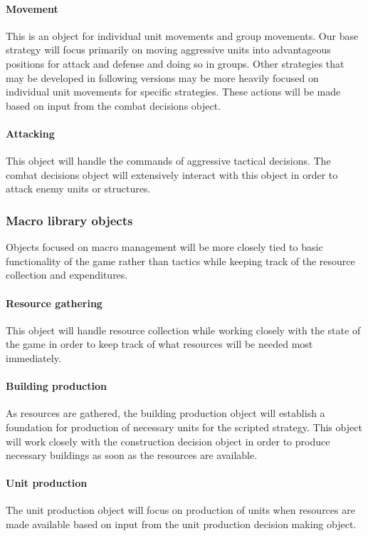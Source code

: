 \documentclass[10pt,letterpaper,onecolumn,draftclsnofoot]{IEEEtran}
\begin{document}
\paragraph{Movement}
This is an object for individual unit movements and group movements. Our base strategy will focus primarily on moving aggressive units into advantageous positions for attack and defense and doing so in groups. Other strategies that may be developed in following versions may be more heavily focused on individual unit movements for specific strategies. These actions will be made based on input from the combat decisions object.

\paragraph{Attacking}
This object will handle the commands of aggressive tactical decisions. The combat decisions object will extensively interact with this object in order to attack enemy units or structures.

\subsubsection{Macro library objects}
Objects focused on macro management will be more closely tied to basic functionality of the game rather than tactics while keeping track of the resource collection and expenditures.

\paragraph{Resource gathering}
This object will handle resource collection while working closely with the state of the game in order to keep track of what resources will be needed most immediately.

\paragraph{Building production}
As resources are gathered, the building production object will establish a foundation for production of necessary units for the scripted strategy. This object will work closely with the construction decision object in order to produce necessary buildings as soon as the resources are available.

\paragraph{Unit production}
The unit production object will focus on production of units when resources are made available based on input from the unit production decision making object. 
\end{document}
